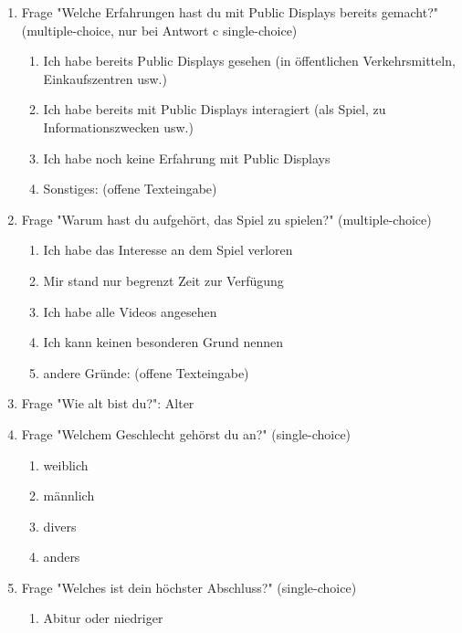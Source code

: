 \begin{enumerate}
\begin{enumerate} [label=\alph*)]
        \item Ich habe auf Jemanden gewartet
        \item Ich hatte Zeit über
        \item Sonstige Gründe: (offene Texteingabe)
    \end{enumerate}
    \item Frage "Welche Erfahrungen hast du mit Public Displays bereits gemacht?" 
        (multiple-choice, nur bei Antwort c single-choice)
    \begin{enumerate}
        \item Ich habe bereits Public Displays gesehen (in öffentlichen Verkehrsmitteln, Einkaufszentren usw.)
        \item Ich habe bereits mit Public Displays interagiert (als Spiel, zu Informationszwecken usw.)
        \item Ich habe noch keine Erfahrung mit Public Displays
	    \item Sonstiges: (offene Texteingabe)
    \end{enumerate}
    \item Frage "Warum hast du aufgehört, das Spiel zu spielen?" (multiple-choice)
    \begin{enumerate}
        \item Ich habe das Interesse an dem Spiel verloren
        \item Mir stand nur begrenzt Zeit zur Verfügung
        \item Ich habe alle Videos angesehen
        \item Ich kann keinen besonderen Grund nennen
        \item andere Gründe: (offene Texteingabe)
    \end{enumerate}
    \item Frage "Wie alt bist du?": Alter 
    \item Frage "Welchem Geschlecht gehörst du an?" (single-choice)
    \begin{enumerate}
        \item weiblich 
        \item männlich 
        \item divers 
        \item anders 
    \end{enumerate}
    \item Frage "Welches ist dein höchster Abschluss?" (single-choice)
    \begin{enumerate}
        \item Abitur oder niedriger

\end{enumerate}
\end{enumerate}
